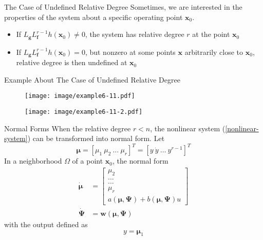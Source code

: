 \documentclass{beamer}
\renewcommand{\vec}[1]{\ensuremath{\boldsymbol{#1}}} %
\begin{document}
\begin{frame}{The Case of Undefined Relative Degree}
    Sometimes, we are interested in the properties of the system about a {\color{red}specific operating point $\vec{x}_{0}$}.

    \begin{itemize}
      \item If $L_{\vec{g}} L_{\vec{f}}^{r-1} h(\vec{x}_{0}) \neq 0$, the system has relative degree $r$ {\color{red}at the point $\vec{x}_{0}$}
      \item If $L_{\vec{g}} L_{\vec{f}}^{r-1} h(\vec{x}_{0}) = 0$, but nonzero at some points \vec{x} arbitrarily close to $\vec{x}_{0}$, relative degree is then {\color{red} undefined} at $\vec{x}_{0}$
    \end{itemize}
\end{frame}

\begin{frame}{Example About The Case of Undefined Relative Degree}
    \begin{figure}
      \centering
      \texttt{[image: image/example6-11.pdf]}
    \end{figure}
    \vspace{-20pt}
    \begin{figure}
      \centering
      \texttt{[image: image/example6-11-2.pdf]}
    \end{figure}
\end{frame}


\begin{frame}{Normal Forms}
    When the relative degree {\color{red}$r<n$}, the nonlinear system (\ref{nonlinear-system}) can be transformed into {\color{red}normal form}. Let
    \begin{equation}\label{translate-state}
      \vec{\mu}=\left[\mu_{1}~\mu_{2}~\dots~\mu_{r}\right]^{T}=\left[y~\dot{y}~\dots~y^{r-1} \right]^{T}
    \end{equation}
    In a neighborhood $\Omega$ of a point $\vec{x}_{0}$, the normal form
    \begin{equation}\label{normal-form}
    \begin{aligned}
      \dot{\vec{\mu}} &= \left[\begin{matrix}
                                \mu_{2} \\
                                \dots \\
                                \dots \\
                                \mu_{r} \\
                                a(\vec{\mu}, \vec{\Psi})+b(\vec{\mu}, \vec{\Psi})u
                              \end{matrix}\right] \\
      \dot{\vec{\Psi}} &= \vec{w}(\vec{\mu}, \vec{\Psi})
    \end{aligned}
    \end{equation}
    with the output defined as
    \begin{equation}\label{normal-form-output}
      y=\vec{\mu}_{1}
    \end{equation}
\end{frame}
\end{document}
